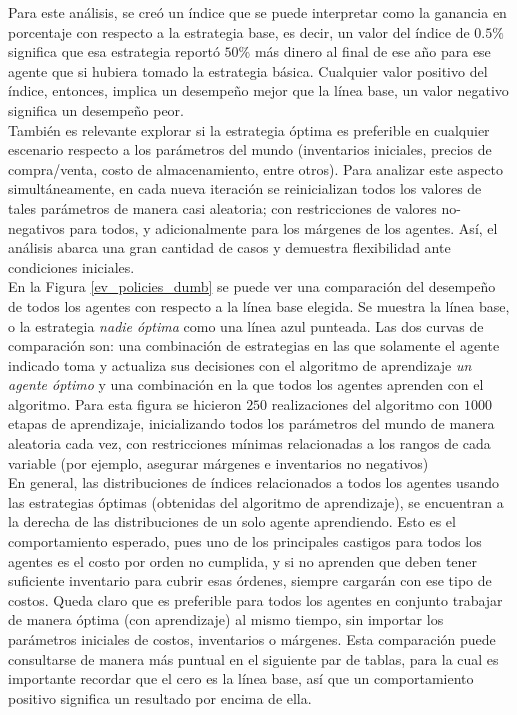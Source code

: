 Para este an\'alisis, se cre\'o un \'indice que se puede interpretar como la ganancia en porcentaje con respecto a la estrategia base, es decir, un valor del \'indice de $0.5\%$ significa que esa estrategia report\'o $50\%$ m\'as dinero al final de ese a\~no para ese agente que si hubiera tomado la estrategia b\'asica. Cualquier valor positivo del \'indice, entonces, implica un desempe\~no mejor que la l\'inea base, un valor negativo significa un desempe\~no peor.\\

Tambi\'en es relevante explorar si la estrategia \'optima es preferible en cualquier escenario respecto a los par\'ametros del mundo (inventarios iniciales, precios de compra/venta, costo de almacenamiento, entre otros). Para analizar este aspecto simult\'aneamente, en cada nueva iteraci\'on se reinicializan todos los valores de tales par\'ametros de manera casi aleatoria; con restricciones de valores no-negativos para todos, y adicionalmente para los m\'argenes de los agentes. As\'i, el an\'alisis abarca una gran cantidad de casos y demuestra flexibilidad ante condiciones iniciales.\\

En la Figura \ref{ev_policies_dumb} se puede ver una comparaci\'on del desempe\~no de todos los agentes con respecto a la l\'inea base elegida. Se muestra la l\'inea base, o la estrategia \textit{nadie \'optima} como una l\'inea azul punteada. Las dos curvas de comparaci\'on son: una combinaci\'on de estrategias en las que solamente el agente indicado toma y actualiza sus decisiones con el algoritmo de aprendizaje \textit{un agente \'optimo} y una combinaci\'on en la que todos los agentes aprenden con el algoritmo. Para esta figura se hicieron $250$ realizaciones del algoritmo con $1000$ etapas de aprendizaje, inicializando todos los par\'ametros del mundo de manera aleatoria cada vez, con restricciones m\'inimas relacionadas a los rangos de cada variable (por ejemplo, asegurar m\'argenes e inventarios no negativos)\\

En general, las distribuciones de índices relacionados a todos los agentes usando las estrategias \'optimas (obtenidas del algoritmo de aprendizaje), se encuentran a la derecha de las distribuciones de un solo agente aprendiendo. Esto es el comportamiento esperado, pues uno de los principales castigos para todos los agentes es el costo por orden no cumplida, y si no aprenden que deben tener suficiente inventario para cubrir esas \'ordenes, siempre cargar\'an con ese tipo de costos. Queda claro que es preferible para todos los agentes en conjunto trabajar de manera \'optima (con aprendizaje) al mismo tiempo, sin importar los par\'ametros iniciales de costos, inventarios o m\'argenes. Esta comparaci\'on puede consultarse de manera m\'as puntual en el siguiente par de tablas, para la cual es importante recordar que el cero es la l\'inea base, as\'i que un comportamiento positivo significa un resultado por encima de ella.\\

